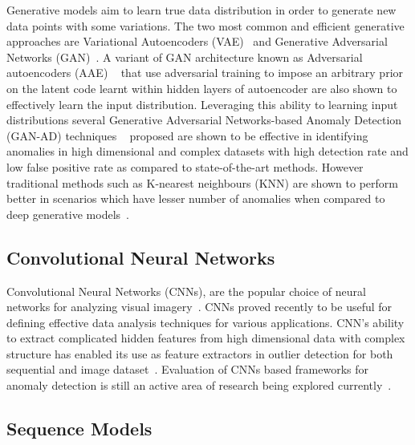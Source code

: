Generative models aim to learn true data distribution in order to generate new data points with some variations. The two most common and efficient generative approaches are Variational Autoencoders (VAE)~\cite{kingma2013auto} and Generative Adversarial Networks (GAN)~\cite{NIPS2014_5423,goodfellow2014generative}. A variant of GAN architecture known as Adversarial autoencoders (AAE) ~\cite{makhzani2015adversarial} that use adversarial training to impose an arbitrary prior on the latent code learnt within hidden layers of autoencoder are also shown to effectively learn the input distribution. Leveraging this ability to learning input distributions several Generative Adversarial Networks-based Anomaly Detection (GAN-AD) techniques ~\cite{li2018anomaly,deecke2018anomaly,schlegl2017unsupervised,ravanbakhsh2017abnormal,eide2018applying}
 proposed are shown to be effective in identifying anomalies in high dimensional and complex datasets  with high detection rate and low false positive rate as compared to state-of-the-art methods. However traditional methods such as K-nearest neighbours (KNN) are shown to perform better in scenarios which have lesser number of anomalies when compared to deep generative models~\cite{vskvara2018generative}.

\subsection{Convolutional Neural Networks }
\label{sec:cnn}
Convolutional Neural Networks (CNNs), are the popular choice of neural networks for analyzing visual imagery~\cite{krizhevsky2012imagenet}. CNNs proved recently to be useful for defining effective data analysis techniques for various applications. CNN’s ability to extract complicated hidden features from high dimensional data with complex structure has enabled its use as feature extractors in outlier detection for both sequential and image dataset~\cite{gorokhov2017convolutional,kim2014convolutional}. Evaluation of CNNs based frameworks for anomaly detection is still an active area of research being explored currently~\cite{kwon2018empirical}.

\subsection{Sequence Models}
\label{sec:rnn_lstm_gru}

